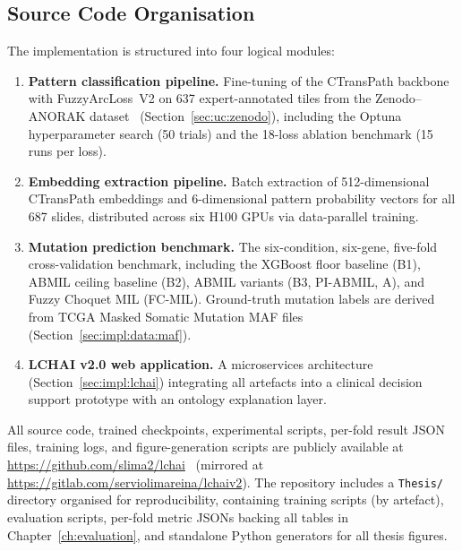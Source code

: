 \subsection{Source Code Organisation}
\label{sec:impl:code_org}

The implementation is structured into four logical modules:
\begin{enumerate}
    \item \textbf{Pattern classification pipeline.}
    Fine-tuning of the CTransPath backbone with FuzzyArcLoss~V2
    on 637 expert-annotated tiles from the Zenodo--ANORAK
    dataset~\cite{anorak2024} (Section~\ref{sec:uc:zenodo}),
    including the Optuna hyperparameter search (50 trials) and the
    18-loss ablation benchmark (15 runs per loss).

    \item \textbf{Embedding extraction pipeline.}
    Batch extraction of 512-dimensional CTransPath embeddings and
    6-dimensional pattern probability vectors for all 687 slides,
    distributed across six H100 GPUs via data-parallel training.

    \item \textbf{Mutation prediction benchmark.}
    The six-condition, six-gene, five-fold cross-validation benchmark,
    including the XGBoost floor baseline (B1), ABMIL ceiling baseline
    (B2), ABMIL variants (B3, PI-ABMIL, A), and Fuzzy Choquet MIL
    (FC-MIL).
    Ground-truth mutation labels are derived from TCGA Masked Somatic
    Mutation MAF files (Section~\ref{sec:impl:data:maf}).

    \item \textbf{LCHAI v2.0 web application.}
    A microservices architecture (Section~\ref{sec:impl:lchai})
    integrating all artefacts into a clinical decision support
    prototype with an ontology explanation layer.
\end{enumerate}

All source code, trained checkpoints, experimental scripts,
per-fold result JSON files, training logs, and figure-generation
scripts are publicly available at
\url{https://github.com/slima2/lchai}~\cite{lchai_repo}
(mirrored at \url{https://gitlab.com/serviolimareina/lchaiv2}).
The repository includes a \texttt{Thesis/} directory organised
for reproducibility, containing training scripts (by artefact),
evaluation scripts, per-fold metric JSONs backing all tables in
Chapter~\ref{ch:evaluation}, and standalone Python generators
for all thesis figures.


